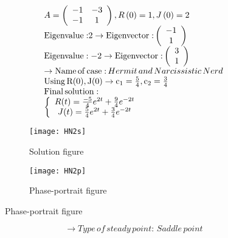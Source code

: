 \documentclass[a4paper]{article}
\begin{document}
\[\begin{array}{l}
A = \left( {\begin{array}{*{20}{c}}
{ - 1}&{ - 3}\\
{ - 1}&1
\end{array}} \right),R\left( 0 \right) = 1,J\left( 0 \right) = 2\\
{\rm{Eigenvalue:}}2 \to {\rm{Eigenvector:}}\left( {\begin{array}{*{20}{c}}
{ - 1}\\
1
\end{array}} \right)\\
{\rm{Eigenvalue: - 2}} \to {\rm{Eigenvector:}}\left( {\begin{array}{*{20}{c}}
3\\
1
\end{array}} \right)\\
 \to {\rm{Name}}\,{\rm{of}}\,{\rm{case:}}\,Hermit\,and\,Narcissistic\,Nerd\\
{\rm{Using}}\,{\rm{R}}({\rm{0}}),{\rm{J}}({\rm{0}}) \to {{\rm{c}}_1} = \frac{5}{4},{{\rm{c}}_2} = \frac{3}{4}\\
{\rm{Final}}\,{\rm{solution:}}\\
\left\{ {\begin{array}{*{20}{c}}
{R(t) = \frac{{ - 5}}{4}{e^{2t}} + \frac{9}{4}{e^{ - 2t}}}\\
{J(t) = \frac{5}{4}{e^{2t}} + \frac{3}{4}{e^{ - 2t}}}
\end{array}} \right.
\end{array}\]
\begin{figure}[H]
\centering
\begin{subfigure}{.5\textwidth}
  \centering
  \texttt{[image: HN2s]}
  \caption*{Solution figure}
\end{subfigure}%
\begin{subfigure}{.5\textwidth}
  \centering
  \texttt{[image: HN2p]}
  \caption*{Phase-portrait figure}
\end{subfigure}
\end{figure}
\[  \to  Type\,of\,steady\,point:\,Saddle\,point\]
\end{document}
